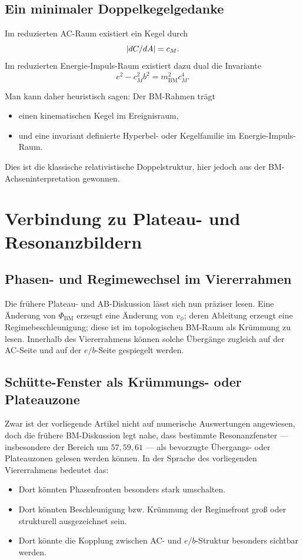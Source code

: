 \documentclass[11pt,a4paper]{article}
\theoremstyle{definition}
\theoremstyle{plain}
\begin{document}
	\subsection{Ein minimaler Doppelkegelgedanke}
	
	Im reduzierten AC-Raum existiert ein Kegel durch
	\[
	\abs{dC/dA} = c_M.
	\]
	Im reduzierten Energie-Impuls-Raum existiert dazu dual die Invariante
	\[
	e^2 - c_M^2 b^2 = m_{\mathrm{BM}}^2 c_M^4.
	\]
	
	Man kann daher heuristisch sagen: Der BM-Rahmen trägt
	\begin{itemize}[leftmargin=2em]
		\item einen kinematischen Kegel im Ereignisraum,
		\item und eine invariant definierte Hyperbel- oder Kegelfamilie im Energie-Impuls-Raum.
	\end{itemize}
	
	Dies ist die klassische relativistische Doppelstruktur, hier jedoch aus der BM-Achseninterpretation gewonnen.
	
	\section{Verbindung zu Plateau- und Resonanzbildern}
	
	\subsection{Phasen- und Regimewechsel im Viererrahmen}
	
	Die frühere Plateau- und AB-Diskussion lässt sich nun präziser lesen. Eine Änderung von $\Phi_{\mathrm{BM}}$ erzeugt eine Änderung von $v_\phi$; deren Ableitung erzeugt eine Regimebeschleunigung; diese ist im topologischen BM-Raum als Krümmung zu lesen. Innerhalb des Viererrahmens können solche Übergänge zugleich auf der AC-Seite und auf der $e/b$-Seite gespiegelt werden.
	
	\subsection{Schütte-Fenster als Krümmungs- oder Plateauzone}
	
	Zwar ist der vorliegende Artikel nicht auf numerische Auswertungen angewiesen, doch die frühere BM-Diskussion legt nahe, dass bestimmte Resonanzfenster --- insbesondere der Bereich um $57,59,61$ --- als bevorzugte Übergangs- oder Plateauzonen gelesen werden können. In der Sprache des vorliegenden Viererrahmens bedeutet das:
	\begin{itemize}[leftmargin=2em]
		\item Dort könnten Phasenfronten besonders stark umschalten.
		\item Dort könnten Beschleunigung bzw. Krümmung der Regimefront groß oder strukturell ausgezeichnet sein.
		\item Dort könnte die Kopplung zwischen AC- und $e/b$-Struktur besonders sichtbar werden.
	\end{itemize}
	
\end{document}
